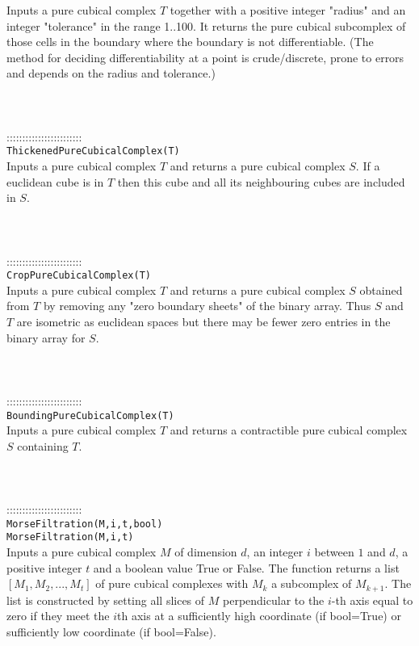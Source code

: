 \documentclass[a4paper,11pt]{report}
\begin{document}
{ Inputs a pure cubical complex $T$ together with a positive integer "radius" and an integer "tolerance" in the
range 1..100. It returns the pure cubical subcomplex of those cells in the
boundary where the boundary is not differentiable. (The method for deciding
differentiability at a point is crude/discrete, prone to errors and depends on
the radius and tolerance.) \\
 \\
 \\
 \\
 ::::::::::::::::::::::::\\
 \texttt{ThickenedPureCubicalComplex(T)}\\
 

 Inputs a pure cubical complex $T$ and returns a pure cubical complex $S$. If a euclidean cube is in $T$ then this cube and all its neighbouring cubes are included in $S$. \\
 \\
 \\
 \\
 ::::::::::::::::::::::::\\
 \texttt{CropPureCubicalComplex(T)}\\
 

 Inputs a pure cubical complex $T$ and returns a pure cubical complex $S$ obtained from $T$ by removing any "zero boundary sheets" of the binary array. Thus $S$ and $T$ are isometric as euclidean spaces but there may be fewer zero entries in the
binary array for $S$. \\
 \\
 \\
 \\
 ::::::::::::::::::::::::\\
 \texttt{BoundingPureCubicalComplex(T)}\\
 

 Inputs a pure cubical complex $T$ and returns a contractible pure cubical complex $S$ containing $T$. \\
 \\
 \\
 \\
 ::::::::::::::::::::::::\\
 \texttt{MorseFiltration(M,i,t,bool)}\\
 \texttt{MorseFiltration(M,i,t)}\\
 

 Inputs a pure cubical complex $M$ of dimension $d$, an integer $i$ between $1$ and $d$, a positive integer $t$ and a boolean value True or False. The function returns a list $[M_1, M_2, ..., M_t]$ of pure cubical complexes with $M_k$ a subcomplex of $M_{k+1}$. The list is constructed by setting all slices of $M$ perpendicular to the $i$-th axis equal to zero if they meet the $i$th axis at a sufficiently high coordinate (if bool=True) or sufficiently low
coordinate (if bool=False). 

}
\end{document}
